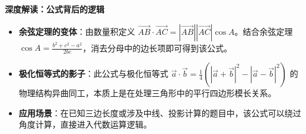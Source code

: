 \begin{explanationbox}
\textbf{深度解读：公式背后的逻辑}
\begin{itemize}
    \item \textbf{余弦定理的变体}：由数量积定义 $\vec{AB} \cdot \vec{AC} = |\vec{AB}||\vec{AC}|\cos A$。结合余弦定理 $\cos A = \frac{b^2+c^2-a^2}{2bc}$，消去分母中的边长项即可得到该公式。
    \item \textbf{极化恒等式的影子}：此公式与极化恒等式 $\vec{a}\cdot\vec{b} = \frac{1}{4}(|\vec{a}+\vec{b}|^2 - |\vec{a}-\vec{b}|^2)$ 的物理结构异曲同工，本质上是在处理三角形中的平行四边形模长关系。
    \item \textbf{应用场景}：在已知三边长度或涉及中线、投影计算的题目中，该公式可以绕过角度计算，直接进入代数运算逻辑。
\end{itemize}
\end{explanationbox}